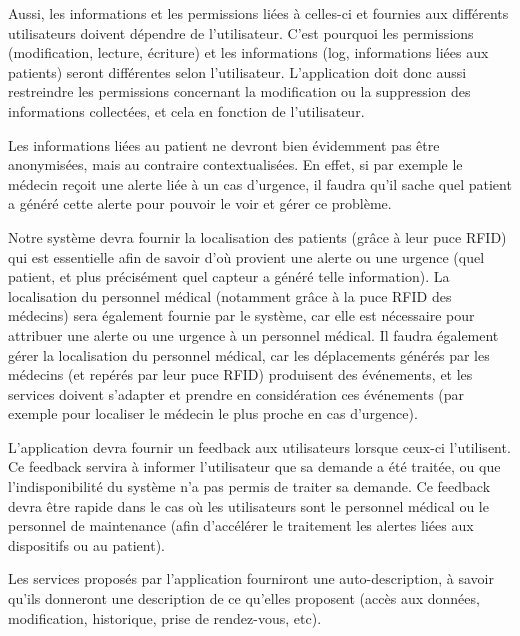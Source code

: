 Aussi, les informations et les permissions liées à celles-ci et fournies aux différents utilisateurs doivent dépendre de l’utilisateur. C'est pourquoi les permissions (modification, lecture, écriture) et les informations (log, informations liées aux patients) seront différentes selon l’utilisateur. L’application doit donc aussi restreindre les permissions concernant la modification ou la suppression des informations collectées, et cela en fonction de l'utilisateur.

Les informations liées au patient ne devront bien évidemment pas être anonymisées, mais au contraire contextualisées. En effet, si par exemple le médecin reçoit une alerte liée à un cas d'urgence, il faudra qu'il sache quel patient a généré cette alerte pour pouvoir le voir et gérer ce problème.

Notre système devra fournir la localisation des patients (grâce à leur puce RFID) qui est essentielle afin de savoir d'où provient une alerte ou une urgence (quel patient, et plus précisément quel capteur a généré telle information). La localisation du personnel médical (notamment grâce à la puce RFID des médecins) sera également fournie par le système, car elle est nécessaire pour attribuer une alerte ou une urgence à un personnel médical. Il faudra également gérer la localisation du personnel médical, car les déplacements générés par les médecins (et repérés par leur puce RFID) produisent des événements, et les services doivent s'adapter et prendre en considération ces événements (par exemple pour localiser le médecin le plus proche en cas d'urgence).

L’application devra fournir un feedback aux utilisateurs lorsque ceux-ci l'utilisent. Ce feedback servira à informer l’utilisateur que sa demande a été traitée, ou que l’indisponibilité du système n’a pas permis de traiter sa demande. Ce feedback devra être rapide dans le cas où les utilisateurs sont le personnel médical ou le personnel de maintenance (afin d'accélérer le traitement les alertes liées aux dispositifs ou au patient).

Les services proposés par l'application fourniront une auto-description, à savoir qu'ils donneront une description de ce qu'elles proposent (accès aux données, modification, historique, prise de rendez-vous, etc).

